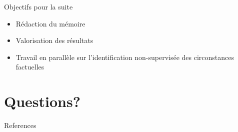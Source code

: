 \documentclass[newPxFont,pagenumber]{beamer}
\begin{document}
\begin{frame}{Objectifs pour la suite}
\begin{itemize}
\item Rédaction du mémoire
\item Valorisation des résultats
\item Travail en parallèle sur l'identification non-supervisée des circonstances factuelles
\end{itemize}
\end{frame}


\section{Questions?}

\begin{frame}[t,allowframebreaks]{References}
\tiny

	
\end{frame}


%
%
%
%
%
%
%
\end{document}
